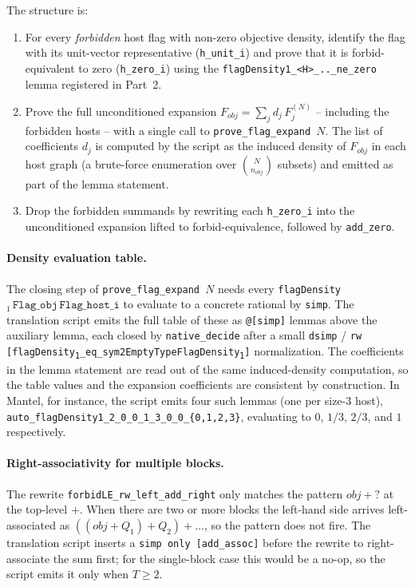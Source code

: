 \documentclass[11pt]{article}
\begin{document}
The structure is:
\begin{enumerate}
  \item For every \emph{forbidden} host flag with non-zero objective
    density, identify the flag with its unit-vector representative
    (\texttt{h\_unit\_i}) and prove that it is forbid-equivalent to
    zero (\texttt{h\_zero\_i}) using the
    \texttt{flagDensity1\_<H>\_..\_ne\_zero} lemma registered in
    Part~2.
  \item Prove the full unconditioned expansion
    $F_{\mathit{obj}} = \sum_j d_j\,F_j^{(N)}$ -- including the
    forbidden hosts -- with a single call to
    \texttt{prove\_flag\_expand $N$}. The list of coefficients $d_j$
    is computed by the script as the induced density of $F_{\mathit{obj}}$
    in each host graph (a brute-force enumeration over
    $\binom{N}{n_{\mathit{obj}}}$ subsets) and emitted as part of the
    lemma statement.
  \item Drop the forbidden summands by rewriting each
    \texttt{h\_zero\_i} into the unconditioned expansion lifted to
    forbid-equivalence, followed by \texttt{add\_zero}.
\end{enumerate}

\paragraph{Density evaluation table.}
The closing step of \texttt{prove\_flag\_expand $N$} needs every
\texttt{flagDensity}$_1\,\texttt{Flag\_obj}\,\texttt{Flag\_host\_i}$ to
evaluate to a concrete rational by \texttt{simp}. The translation script
emits the full table of these as \texttt{@[simp]} lemmas above the
auxiliary lemma, each closed by \texttt{native\_decide} after a small
\texttt{dsimp} / \texttt{rw [flagDensity\textsubscript{1}\_eq\_sym2EmptyTypeFlagDensity\textsubscript{1}]} normalization.
The coefficients in the lemma statement are read out of the same
induced-density computation, so the table values and the expansion
coefficients are consistent by construction. In Mantel, for instance,
the script emits four such lemmas (one per size-$3$ host),
\texttt{auto\_flagDensity1\_2\_0\_0\_1\_3\_0\_0\_\{0,1,2,3\}}, evaluating
to $0$, $1/3$, $2/3$, and $1$ respectively.

\paragraph{Right-associativity for multiple blocks.}
The rewrite \texttt{forbidLE\_rw\_left\_add\_right} only matches the
pattern $\mathit{obj} + \texttt{?}$ at the top-level $+$. When there
are two or more blocks the left-hand side arrives left-associated as
$((\mathit{obj} + Q_1) + Q_2) + \ldots$, so the pattern does not fire.
The translation script inserts a \texttt{simp only [add\_assoc]} before
the rewrite to right-associate the sum first; for the single-block case
this would be a no-op, so the script emits it only when $T \ge 2$.
\end{document}
